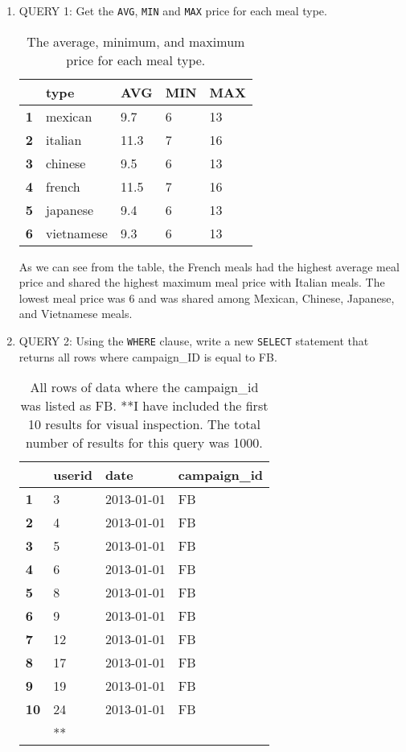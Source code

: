 \documentclass[]{article}
\newcommand{\code}[1]{\colorbox{light-gray}{\texttt{#1}}}
\begin{document}
\begin{enumerate}
	
\item QUERY 1: Get the \code{AVG}, \code{MIN} and \code{MAX} price for each meal type.
\pagebreak
\begin{table}[!ht]
	\centering
	\begin{tabular}{| l | l  l  l l| }
		\hline
		&\textbf{type} & \textbf{ AVG} & \textbf{MIN} & \textbf{MAX}\\
		\hline
		\textbf{1}& mexican& 9.7 & 6 & 13\\
		\textbf{2}&italian & 11.3 & 7 & 16\\
		\textbf{3}& chinese& 9.5 & 6 & 13\\
		\textbf{4}&french & 11.5 & 7 & 16\\
		\textbf{5}&japanese & 9.4 & 6 & 13\\
		\textbf{6}&vietnamese & 9.3 & 6 & 13\\
		\hline
	\end{tabular}
	\caption{The average, minimum, and maximum price for each meal type.}
\end{table}

As we can see from the table, the French meals had the highest average meal price and shared the highest maximum meal price with Italian meals.  The lowest meal price was 6 and was shared among Mexican, Chinese, Japanese, and Vietnamese meals.
  
\item QUERY 2: Using the \code{WHERE} clause, write a new \code{SELECT} statement that returns all rows where campaign\_ID is equal to FB.

\begin{table}[!ht]
	\centering
	\begin{tabular}{| l | l  l  l| }
		\hline
		&\textbf{userid} & \textbf{ date} & \textbf{campaign\_id} \\
		\hline
		\textbf{1}&3 & 2013-01-01 & FB\\
		\textbf{2}& 4& 2013-01-01 & FB\\
		\textbf{3}&5 & 2013-01-01 & FB\\
		\textbf{4}& 6& 2013-01-01 & FB\\
		\textbf{5}& 8& 2013-01-01 & FB\\
		\textbf{6}& 9& 2013-01-01 & FB\\
		\textbf{7}& 12& 2013-01-01 & FB\\
		\textbf{8}& 17& 2013-01-01 & FB\\
		\textbf{9}& 19& 2013-01-01 & FB\\
		\textbf{10}& 24& 2013-01-01 & FB\\
		&**&&\\
		\hline
	\end{tabular}
	\caption{All rows of data where the campaign\_id was listed as FB.  **I have included the first 10 results for visual inspection.  The total number of results for this query was 1000.}
\end{table}


\end{enumerate}
\end{document}
